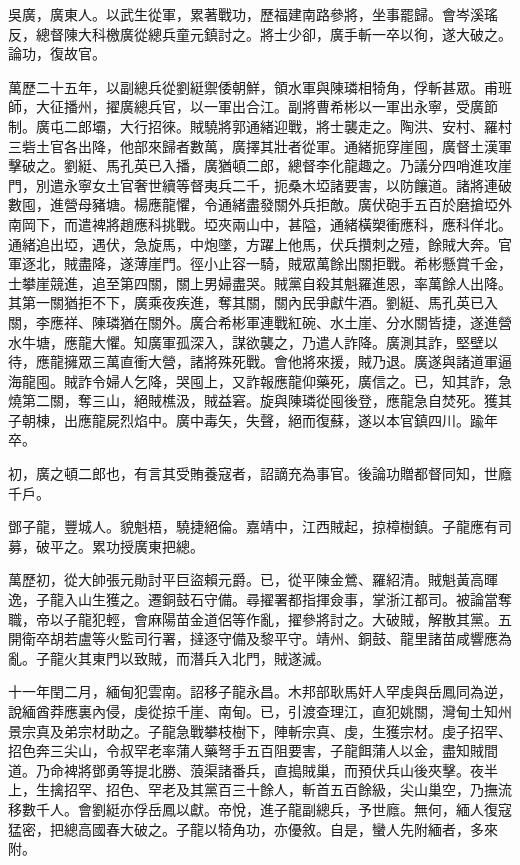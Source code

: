 \begin{pinyinscope}
吳廣，廣東人。以武生從軍，累著戰功，歷福建南路參將，坐事罷歸。會岑溪瑤反，總督陳大科檄廣從總兵童元鎮討之。將士少卻，廣手斬一卒以徇，遂大破之。論功，復故官。

萬歷二十五年，以副總兵從劉綎禦倭朝鮮，領水軍與陳璘相犄角，俘斬甚眾。甫班師，大征播州，擢廣總兵官，以一軍出合江。副將曹希彬以一軍出永寧，受廣節制。廣屯二郎壩，大行招徠。賊驍將郭通緒迎戰，將士襲走之。陶洪、安村、羅村三砦土官各出降，他部來歸者數萬，廣擇其壯者從軍。通緒扼穿崖囤，廣督土漢軍擊破之。劉綎、馬孔英已入播，廣猶頓二郎，總督李化龍趣之。乃議分四哨進攻崖門，別遣永寧女土官奢世續等督夷兵二千，扼桑木埡諸要害，以防饟道。諸將連破數囤，進營母豬塘。楊應龍懼，令通緒盡發關外兵拒敵。廣伏砲手五百於磨搶埡外南岡下，而遣裨將趙應科挑戰。埡夾兩山中，甚隘，通緒橫槊衝應科，應科佯北。通緒追出埡，遇伏，急旋馬，中炮墜，方躍上他馬，伏兵攢刺之殪，餘賊大奔。官軍逐北，賊盡降，遂薄崖門。徑小止容一騎，賊眾萬餘出關拒戰。希彬懸賞千金，士攀崖競進，追至第四關，關上男婦盡哭。賊黨自殺其魁羅進恩，率萬餘人出降。其第一關猶拒不下，廣乘夜疾進，奪其關，關內民爭獻牛酒。劉綎、馬孔英已入關，李應祥、陳璘猶在關外。廣合希彬軍連戰紅碗、水土崖、分水關皆捷，遂進營水牛塘，應龍大懼。知廣軍孤深入，謀欲襲之，乃遣人詐降。廣測其詐，堅壁以待，應龍擁眾三萬直衝大營，諸將殊死戰。會他將來援，賊乃退。廣遂與諸道軍逼海龍囤。賊詐令婦人乞降，哭囤上，又詐報應龍仰藥死，廣信之。已，知其詐，急燒第二關，奪三山，絕賊樵汲，賊益窘。旋與陳璘從囤後登，應龍急自焚死。獲其子朝棟，出應龍屍烈焰中。廣中毒矢，失聲，絕而復蘇，遂以本官鎮四川。踰年卒。

初，廣之頓二郎也，有言其受賄養寇者，詔謫充為事官。後論功贈都督同知，世廕千戶。

鄧子龍，豐城人。貌魁梧，驍捷絕倫。嘉靖中，江西賊起，掠樟樹鎮。子龍應有司募，破平之。累功授廣東把總。

萬歷初，從大帥張元勛討平巨盜賴元爵。已，從平陳金鶯、羅紹清。賊魁黃高暉逸，子龍入山生獲之。遷銅鼓石守備。尋擢署都指揮僉事，掌浙江都司。被論當奪職，帝以子龍犯輕，會麻陽苗金道侶等作亂，擢參將討之。大破賊，解散其黨。五開衛卒胡若盧等火監司行署，撻逐守備及黎平守。靖州、銅鼓、龍里諸苗咸響應為亂。子龍火其東門以致賊，而潛兵入北門，賊遂滅。

十一年閏二月，緬甸犯雲南。詔移子龍永昌。木邦部耿馬奸人罕虔與岳鳳同為逆，說緬酋莽應裏內侵，虔從掠千崖、南甸。已，引渡查理江，直犯姚關，灣甸土知州景宗真及弟宗材助之。子龍急戰攀枝樹下，陣斬宗真、虔，生獲宗材。虔子招罕、招色奔三尖山，令叔罕老率蒲人藥弩手五百阻要害，子龍餌蒲人以金，盡知賊間道。乃命裨將鄧勇等提北勝、蒗渠諸番兵，直搗賊巢，而預伏兵山後夾擊。夜半上，生擒招罕、招色、罕老及其黨百三十餘人，斬首五百餘級，尖山巢空，乃撫流移數千人。會劉綎亦俘岳鳳以獻。帝悅，進子龍副總兵，予世廕。無何，緬人復寇猛密，把總高國春大破之。子龍以犄角功，亦優敘。自是，蠻人先附緬者，多來附。


\end{pinyinscope}
